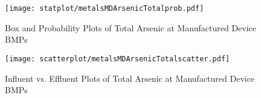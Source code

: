         \begin{figure}[hb]   %
            \centering
            \texttt{[image: statplot/metalsMDArsenicTotalprob.pdf]}
            \caption{Box and Probability Plots of Total Arsenic at Manufactured Device BMPs}
        \end{figure}         %
        
        
        \begin{figure}[hb]   %
            \centering
            \texttt{[image: scatterplot/metalsMDArsenicTotalscatter.pdf]}
            \caption{Influent vs. Effluent Plots of Total Arsenic at Manufactured Device BMPs}
        \end{figure}         %
        \clearpage
        